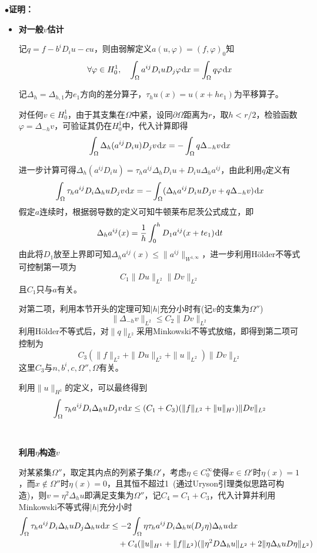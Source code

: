 \documentclass[a4paper,UTF8,fontset=windows,AutoFakeBold]{ctexart}
\newcommand*{\dr}{\hspace{0.07em}\mathrm{d}}
\newcommand{\proo}[1]{{\kaishu $\bullet$\textbf{证明：}
\begin{itemize}
    \item[] #1
\end{itemize}
}}
\begin{document}
\proo{
    \textbf{对一般$v$估计}

    记$q=f-b^iD_iu-cu$，则由弱解定义$a(u,\varphi)=(f,\varphi)_0$知
    $$\forall\varphi\in H_0^1,\quad\int_\Omega a^{ij}D_iuD_j\varphi\dr x=\int_\Omega q\varphi\dr x$$

    记$\Delta_h=\Delta_{h,1}$为$e_1$方向的差分算子，$\tau_hu(x)=u(x+he_1)$为平移算子。
    
    对任何$v\in H_0^1$，由于其支集在$\Omega$中紧，设同$\partial\Omega$距离为$r$，取$h<r/2$，检验函数$\varphi=\Delta_{-h}v$，可验证其仍在$H_0^1$中，代入计算即得
    $$\int_\Omega\Delta_h(a^{ij}D_iu)D_jv\dr x=-\int_\Omega q\Delta_{-h}v\dr x$$

    进一步计算可得$\Delta_h(a^{ij}D_iu)=\tau_ha^{ij}\Delta_hD_iu+D_iu\Delta_ha^{ij}$，由此利用$q$定义有
    $$\int_{\Omega}\tau_ha^{ij}D_i\Delta_huD_jv\dr x=-\int_\Omega(\Delta_ha^{ij}D_iuD_jv+q\Delta_{-h}v)\dr x$$
    假定$a$连续时，根据弱导数的定义可知牛顿莱布尼茨公式成立，即
    $$\Delta_ha^{ij}(x)=\frac{1}{h}\int_0^hD_1a^{ij}(x+te_1)\dr t$$
    由此将$D_1$放至上界即可知$\Delta_ha^{ij}(x)\le\|a^{ij}\|_{W^{1,\infty}}$，进一步利用H\"older不等式可控制第一项为
    $$C_1\|Du\|_{L^2}\|Dv\|_{L^2}$$
    且$C_1$只与$a$有关。

    对第二项，利用本节开头的定理可知$|h|$充分小时有(记$v$的支集为$\Omega''$)
    $$\|\Delta_{-h}v\|_{L^2}\le C_2\|Dv\|_{L^2}$$
    利用H\"older不等式后，对$\|q\|_{L^2}$采用Minkowski不等式放缩，即得到第二项可控制为
    $$C_3(\|f\|_{L^2}+\|Du\|_{L^2}+\|u\|_{L^2})\|Dv\|_{L^2}$$
    这里$C_3$与$n,b^i,c,\Omega'',\Omega$有关。

    利用$\|u\|_{H^1}$的定义，可以最终得到
    $$\int_{\Omega}\tau_ha^{ij}D_i\Delta_huD_jv\dr x\le(C_1+C_3)(\|f\|_{L^2}+\|u\|_{H^1})\|Dv\|_{L^2}$$

    \

    \textbf{利用$\eta$构造$v$}

    对某紧集$\Omega''$，取定其内点的列紧子集$\Omega'$，考虑$\eta\in C_0^\infty$使得$x\in\Omega'$时$\eta(x)=1$，而$x\notin\Omega''$时$\eta(x)=0$，且其恒不超过1\ (通过Uryson引理类似思路可构造)，则$v=\eta^2\Delta_hu$即满足支集为$\Omega''$，记$C_4=C_1+C_3$，代入计算并利用Minkowski不等式得$|h|$充分小时
    $$\begin{aligned}\int_\Omega\tau_ha^{ij}D_i\Delta_huD_j\Delta_hu\dr x&\le-2\int_\Omega\eta\tau_ha^{ij}D_i\Delta_hu(D_j\eta)\Delta_hu\dr x\\ &\quad+C_4(\|u\|_{H^1}+\|f\|_{L^2})(\|\eta^2D\Delta_hu\|_{L^2}+2\|\eta\Delta_huD\eta\|_{L^2})\end{aligned}$$

}
\end{document}
